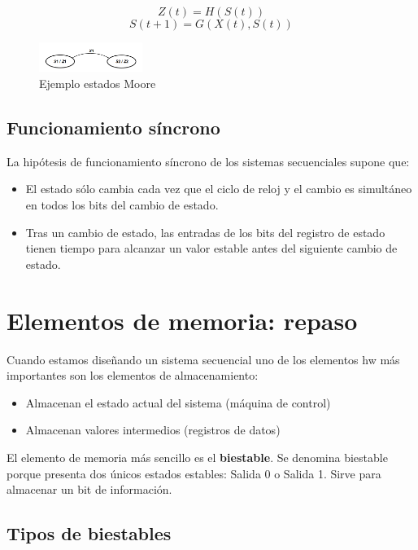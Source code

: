\begin{multicols}{2}
	\[
		Z\left(t\right) = H\left(S\left(t\right)\right)
	\]
	\[
		S\left(t+1\right)= G\left(X\left(t\right), S\left(t\right)\right)
	\]
	\vfill
	\null
	\begin{figure}[H]
		\centering
		\includegraphics[width=0.3\textwidth]{images/Tema_4/Moore.PNG}
		\caption{Ejemplo estados Moore}
	\end{figure}
\end{multicols}

\subsection{Funcionamiento síncrono}
La hipótesis de funcionamiento síncrono de los sistemas secuenciales supone que:
\begin{itemize}
	\item El estado sólo cambia cada vez que el ciclo de reloj y el cambio es simultáneo en todos los bits del cambio de estado.
	\item Tras un cambio de estado, las entradas de los bits del registro de estado tienen tiempo para alcanzar un valor estable antes del siguiente cambio de estado.
\end{itemize}
\section{Elementos de memoria: repaso}
Cuando estamos diseñando un sistema secuencial uno de los elementos \gls{hw} más importantes son los elementos de almacenamiento:
\begin{itemize}
	\item Almacenan el estado actual del sistema (máquina de control)
	\item Almacenan valores intermedios (registros de datos)
\end{itemize}

El elemento de memoria más sencillo es el \textbf{biestable}. Se denomina biestable porque presenta dos únicos estados estables: Salida 0 o Salida 1. Sirve para almacenar un bit de información.
\subsection{Tipos de biestables}

